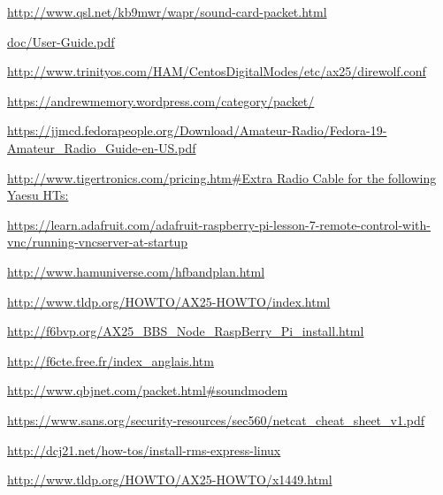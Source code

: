 \href{http://www.qsl.net/kb9mwr/wapr/sound-card-packet.html}{http://www.qsl.net/kb9mwr/wapr/sound-card-packet.html}

\href{https://github.com/wb2osz/direwolf/blob/master/doc/User-Guide.pdf}{doc/User-Guide.pdf}

\href{http://www.trinityos.com/HAM/CentosDigitalModes/etc/ax25/direwolf.conf}{http://www.trinityos.com/HAM/CentosDigitalModes/etc/ax25/direwolf.conf}

\href{https://andrewmemory.wordpress.com/category/packet/}{https://andrewmemory.wordpress.com/category/packet/}

\href{https://jjmcd.fedorapeople.org/Download/Amateur-Radio/Fedora-19-Amateur\_Radio\_Guide-en-US.pdf}{https://jjmcd.fedorapeople.org/Download/Amateur-Radio/Fedora-19-Amateur\_Radio\_Guide-en-US.pdf}

\href{http://www.tigertronics.com/pricing.htm\#Extra\%20Radio\%20Cable\%20for\%20the\%20following\%20Yaesu\%20HTs:}{http://www.tigertronics.com/pricing.htm\#Extra Radio Cable for the following Yaesu HTs:}

\href{https://learn.adafruit.com/adafruit-raspberry-pi-lesson-7-remote-control-with-vnc/running-vncserver-at-startup}{https://learn.adafruit.com/adafruit-raspberry-pi-lesson-7-remote-control-with-vnc/running-vncserver-at-startup}

\href{http://www.hamuniverse.com/hfbandplan.html}{http://www.hamuniverse.com/hfbandplan.html}

\href{http://www.tldp.org/HOWTO/AX25-HOWTO/index.html}{http://www.tldp.org/HOWTO/AX25-HOWTO/index.html}

\href{http://f6bvp.org/AX25\_BBS\_Node\_RaspBerry\_Pi\_install.html}{http://f6bvp.org/AX25\_BBS\_Node\_RaspBerry\_Pi\_install.html}

\href{http://f6cte.free.fr/index\_anglais.htm}{http://f6cte.free.fr/index\_anglais.htm}

\href{http://www.qbjnet.com/packet.html\#soundmodem}{http://www.qbjnet.com/packet.html\#soundmodem}

\href{https://www.sans.org/security-resources/sec560/netcat\_cheat\_sheet\_v1.pdf}{https://www.sans.org/security-resources/sec560/netcat\_cheat\_sheet\_v1.pdf}

\href{http://dcj21.net/how-tos/install-rms-express-linux}{http://dcj21.net/how-tos/install-rms-express-linux}

\href{http://www.tldp.org/HOWTO/AX25-HOWTO/x1449.html}{http://www.tldp.org/HOWTO/AX25-HOWTO/x1449.html}

